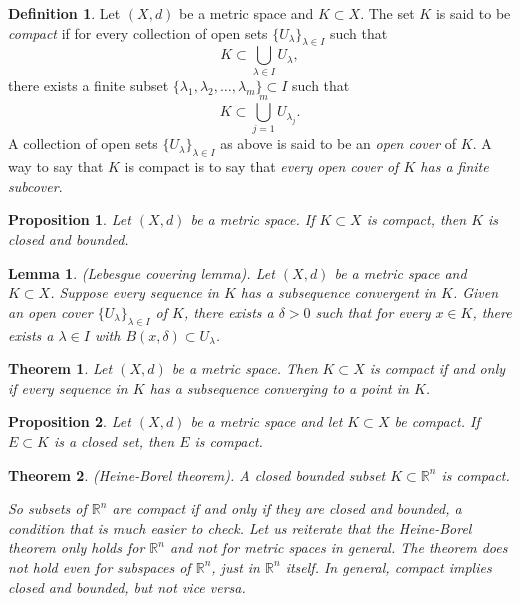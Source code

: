 \documentclass{article}
\newtheorem{theorem}{Theorem}[section]
\newtheorem{lemma}{Lemma}[section]
\newtheorem{proposition}{Proposition}[section]
\theoremstyle{definition}
\newtheorem{definition}{Definition}[section]
\theoremstyle{remark}
\begin{document}
\begin{definition} \label{def:compact_set}
Let \( (X, d) \) be a metric space and \( K \subset X \). The set \( K \) is said to be \textit{compact} if for every collection of open sets \( \{ U_{\lambda} \}_{\lambda \in I} \) such that
\[
K \subset \bigcup_{\lambda \in I} U_{\lambda},
\]
there exists a finite subset \( \{\lambda_1, \lambda_2, \dots, \lambda_m\} \subset I \) such that
\[
K \subset \bigcup_{j=1}^{m} U_{\lambda_j}.
\]
A collection of open sets \( \{U_{\lambda} \}_{\lambda \in I} \) as above is said to be an \textit{open cover} of \( K \). A way to say that \( K \) is compact is to say that \textit{every open cover of \( K \) has a finite subcover}.
\end{definition}

\begin{proposition} \label{prop:compact_closed_bounded}
Let \( (X, d) \) be a metric space. If \( K \subset X \) is compact, then \( K \) is closed and bounded.
\end{proposition}

\begin{lemma} \label{lem:lebesgue_covering}
(Lebesgue covering lemma). Let \( (X, d) \) be a metric space and \( K \subset X \). Suppose every sequence in \( K \) has a subsequence convergent in \( K \). Given an open cover \( \{U_{\lambda}\}_{\lambda \in I} \) of \( K \), there exists a \( \delta > 0 \) such that for every \( x \in K \), there exists a \( \lambda \in I \) with \( B(x, \delta) \subset U_{\lambda} \).
\end{lemma}

\begin{theorem} \label{thm:compactness_sequential}
Let \( (X, d) \) be a metric space. Then \( K \subset X \) is compact if and only if every sequence in \( K \) has a subsequence converging to a point in \( K \).
\end{theorem}

\begin{proposition} \label{prop:compact_closed_subset}
Let \( (X, d) \) be a metric space and let \( K \subset X \) be compact. If \( E \subset K \) is a closed set, then \( E \) is compact.
\end{proposition}

\begin{theorem} \label{thm:heine_borel}
(Heine-Borel theorem). A \textit{closed bounded} subset \( K \subset \mathbb{R}^n \) is compact.

So subsets of \( \mathbb{R}^n \) are compact if and only if they are closed and bounded, a condition that is much easier to check. Let us reiterate that the Heine-Borel theorem only holds for \( \mathbb{R}^n \) and not for metric spaces in general. The theorem does not hold even for subspaces of \( \mathbb{R}^n \), just in \( \mathbb{R}^n \) itself. In general, compact implies closed and bounded, but not vice versa.
\end{theorem}
\end{document}
